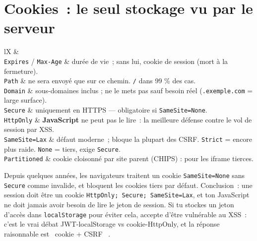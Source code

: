 \section{Cookies~: le seul stockage vu par le serveur}


\begin{tabz}{lX}
  \headrow {} \&  \\
  \midrule
  \verb|Expires| / \verb|Max-Age| \& dur\'ee de vie~; sans lui, cookie de session (mort \`a la fermeture). \\
  \verb|Path| \& ne sera envoy\'e que sur ce chemin. \verb|/| dans 99 \% des cas. \\
  \verb|Domain| \& sous-domaines inclus ; ne le mets pas sauf besoin r\'eel (\verb|.exemple.com| = large surface). \\
  \verb|Secure| \& uniquement en HTTPS --- obligatoire si \verb|SameSite=None|. \\
  \verb|HttpOnly| \& \textbf{JavaScript} ne peut pas le lire~: la meilleure d\'efense contre le vol de session par XSS. \\
  \verb|SameSite=Lax|  \& d\'efaut moderne~; bloque la plupart des CSRF. \verb|Strict| = encore plus raide. \verb|None| = tiers, exige \verb|Secure|. \\
  \verb|Partitioned| \& cookie cloisonn\'e par site parent (CHIPS) : pour les iframe tierces. \\
\end{tabz}

\begin{note}
Depuis quelques ann\'ees, les navigateurs traitent un cookie \verb|SameSite=None| sans
\verb|Secure| comme invalide, et bloquent les cookies tiers par d\'efaut. Conclusion~: une
session doit \^etre un cookie \verb|HttpOnly; Secure; SameSite=Lax|, et ton JavaScript ne doit
jamais avoir besoin de lire le jeton de session. Si tu stockes un jeton d'acc\`es dans
\verb|localStorage| pour \'eviter cela, accepte d'\^etre vuln\'erable au XSS~: c'est le vrai d\'ebat
JWT-localStorage vs cookie-HttpOnly, et la r\'eponse raisonnable est \og ~cookie + CSRF~ \fg{}.
\end{note}

